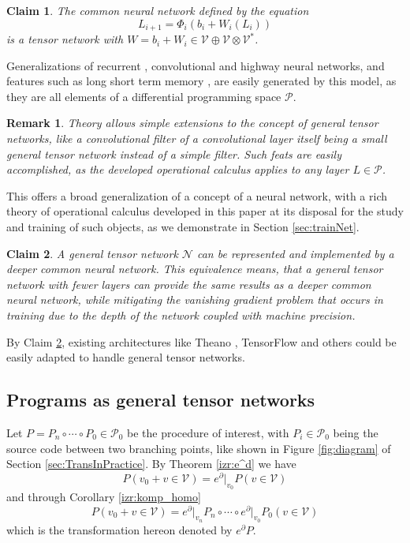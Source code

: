 \documentclass[smallcondensed]{svjour3}
\newcommand{\VV}{\mathcal{V}}
\newcommand{\NN}{\mathcal{N}}
\newcommand{\dP}{\mathcal{P}}
\newcommand{\D}{\partial}
\newtheorem{trditev}{Claim}[section]
\newtheorem{opomba}{Remark}[section]
\begin{document}
\begin{trditev}
The common neural network defined by the equation
$$L_{i+1}=\Phi_i(b_i+W_i(L_i))$$
is a tensor network with $W=b_i+W_i\in \VV\oplus \VV\otimes \VV^*$.
\end{trditev}

Generalizations of recurrent \cite{RecurrentNet}, convolutional \cite{ConvNet} and highway  \cite{HighwayNet} neural networks, and features such as long short term memory \cite{LSTM}, are easily generated by this model, as they are all elements of a differential programming space $\dP$.

\begin{opomba}
Theory allows simple extensions to the concept of general tensor networks, like a convolutional filter of a convolutional layer itself being a small general tensor network instead of a simple filter. Such feats are easily accomplished, as the developed operational calculus applies to any layer $L\in\dP$. 
\end{opomba}

This offers a broad generalization of a concept of a neural network, with a rich theory of operational calculus developed in this paper at its disposal for the study and training of such objects, as we demonstrate in Section \ref{sec:trainNet}.

\begin{trditev}\label{trd:netEquivalence}
A general tensor network $\NN$ can be represented and implemented by a deeper common neural network. This equivalence means, that a general tensor network with fewer layers can provide the same results as a deeper common neural network, while mitigating the vanishing gradient problem \cite{VanishingGradient} that occurs in training due to the depth of the network coupled with machine precision.
\end{trditev}

By Claim \ref{trd:netEquivalence}, existing architectures like Theano \cite{Theano}, TensorFlow \cite{TensorFlow} and others could be easily adapted to handle general tensor networks.

\subsection{Programs as general tensor networks}\label{sec:progAsNet}

Let $P=P_n\circ\cdots\circ P_0\in\dP_0$ be the procedure of interest, with $P_i\in\dP_0$ being the source code between two branching points, like shown in Figure \ref{fig:diagram} of Section \ref{sec:TransInPractice}.
By Theorem \ref{izr:e^d} we have
\begin{equation}
P(v_0+v\in \VV)=e^\D\vert_{v_0} P(v\in \VV)
\end{equation}
and through Corollary \ref{izr:komp_homo}
\begin{equation}\label{eq:eDkompo}
P(v_0+v\in \VV)=e^\D\vert_{v_n} P_n\circ\cdots \circ e^\D\vert_{v_0} P_0(v\in \VV)
\end{equation}
which is the transformation hereon denoted by $e^\D P$.
\end{document}
